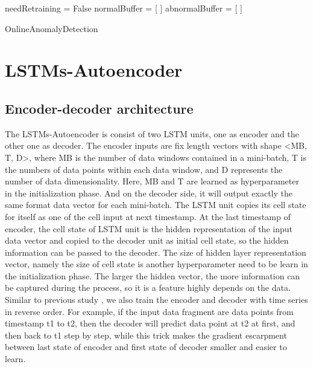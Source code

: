 \begin{algorithm}[h]

\BlankLine 
needRetraining = False\;
normalBuffer = [ ]\;
abnormalBuffer = [ ]\;
\BlankLine 

 \caption{OnlineAnomalyDetection}
\label{alg:pipeline}
\end{algorithm}



\section{LSTMs-Autoencoder}
\label{sec:initialization}

\subsection{Encoder-decoder architecture}
\label{sec:Encoder-decoder architecture}

The LSTMs-Autoencoder is consist of two LSTM units, one as encoder and the other one as decoder. The encoder inputs are fix length vectors with shape <MB, T, D>, where MB is the number of data windows contained in a mini-batch, T is the numbers of data points within each data window, and D represents the number of data dimensionality. Here, MB and T are learned as hyperparameter in the initialization phase. And on the decoder side, it will output exactly the same format data vector for each mini-batch. The LSTM unit copies its cell state for itself as one of the cell input at next timestamp. At the last timestamp of encoder, the cell state of LSTM unit is the hidden representation of the input data vector and copied to the decoder unit as initial cell state, so the hidden information can be passed to the decoder. The size of hidden layer representation vector, namely the size of cell state is another hyperparameter need to be learn in the initialization phase. The larger the hidden vector, the more information can be captured during the process, so it is a feature highly depends on the data. Similar to previous study \cite{seq2seq}, we also train the encoder and decoder with time series in reverse order. For example, if the input data fragment are data points from timestamp t1 to t2, then the decoder will predict data point at t2 at first, and then back to t1 step by step, while this trick makes the gradient escarpment between last state of encoder and first state of decoder smaller and easier to learn. \\

